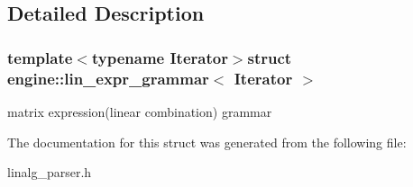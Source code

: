 \subsection{Detailed Description}
\subsubsection*{template$<$typename Iterator$>$struct engine\-::lin\-\_\-expr\-\_\-grammar$<$ Iterator $>$}

matrix expression(linear combination) grammar 

The documentation for this struct was generated from the following file\-:\begin{DoxyCompactItemize}
\item 
linalg\-\_\-parser.\-h\end{DoxyCompactItemize}
